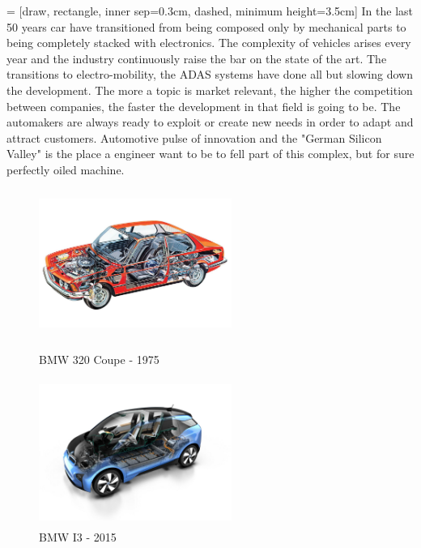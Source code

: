 \documentclass[../main.tex]{subfiles}
\begin{document}
 = [draw, rectangle, inner sep=0.3cm, dashed, minimum height=3.5cm]
In the last 50 years car have transitioned from being composed only by mechanical parts to being completely stacked with electronics. The complexity of vehicles arises every year and the industry continuously raise the bar on the state of the art. The transitions to electro-mobility, the ADAS systems have done all but slowing down the development. The more a topic is market relevant, the higher the competition between companies, the faster the development in that field is going to be. The automakers are always ready to exploit or create new needs in order to adapt and attract customers. Automotive pulse of innovation and the "German Silicon Valley" is the place a engineer want to be to fell part of this complex, but for sure perfectly oiled machine.   
\begin{figure}
\centering
\begin{minipage}{.5\textwidth}
  \centering
  \includegraphics[width=6.3cm, height=4.8cm]{images_folder/4a56e1d50b56da42a10e29d451cf2b93.jpg}
  \caption{BMW 320 Coupe - 1975}
  \label{fig:test1}
\end{minipage}%
\begin{minipage}{.5\textwidth}
  \centering
  \includegraphics[width=6.3cm, height=4.8cm]{images_folder/BMW_i3.jpg}
  \caption{BMW I3 - 2015}
  \label{fig:test2}
\end{minipage}
\end{figure}
\end{document}
